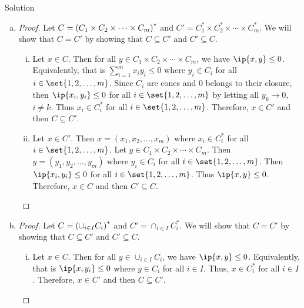\documentclass{article}
\begin{document}
\begin{solution}
    {Solution}
    \begin{enumerate}[(a)]
        \item {
            \begin{proof}
                Let $C=\parens*{C_1 \times C_2 \times \cdots \times C_m}^*$ and $C' = C_1^*\times C_2^* \times \cdots \times C_m^*$. We will show that $C=C'$ by showing that $C\subseteq C'$ and $C'\subseteq C$.
                \begin{enumerate}[(i)]
                    \item {
                        Let $x\in C$. Then for all $y\in C_1\times C_2\times\cdots\times C_m$, we have $\ip{x,y}\leq 0$. Equivalently, that is $\sum_{i=1}^{m}x_i y_i\leq0$ where $y_i\in C_i$ for all $i\in\set{1,2,\ldots,m}$. Since $C_i$ are cones and $0$ belongs to their closure,  then $\ip{x_i,y_i}\leq 0$ for all $i\in\set{1,2,\ldots,m}$ by letting all $y_k\rightarrow 0$, $i\neq k$. Thus $x_i\in C_i^*$ for all $i\in\set{1,2,\ldots,m}$. Therefore, $x\in C'$ and then $C\subseteq C'$.
                    }
                    \item {
                        Let $x\in C'$. Then $x=(x_1,x_2,\ldots,x_m)$ where $x_i\in C_i^*$ for all $i\in\set{1,2,\ldots,m}$. Let $y\in C_1\times C_2\times\cdots\times C_m$. Then $y=(y_1,y_2,\ldots,y_m)$ where $y_i\in C_i$ for all $i\in\set{1,2,\ldots,m}$. Then $\ip{x_i,y_i}\leq 0$ for all $i\in\set{1,2,\ldots,m}$. Thus $\ip{x,y}\leq 0$. Therefore, $x\in C$ and then $C'\subseteq C$.
                    }
                \end{enumerate}
            \end{proof}
        }
        \item {
            \begin{proof}
                Let $C=\parens*{\cup_{i\in I}C_i}^*$ and $C'=\cap_{i\in I}C_i^*$. We will show that $C=C'$ by showing that $C\subseteq C'$ and $C'\subseteq C$.
                \begin{enumerate}[(i)]
                    \item {
                        Let $x\in C$. Then for all $y\in \cup_{i\in I}C_i$, we have $\ip{x,y}\leq 0$. Equivalently, that is $\ip{x,y_i}\leq0$ where $y\in C_i$ for all $i\in I$. Thus, $x\in C_i^*$ for all $i\in I$. Therefore, $x\in C'$ and then $C\subseteq C'$.
                    }

\end{enumerate}
\end{proof}}
\end{enumerate}
\end{solution}
\end{document}

